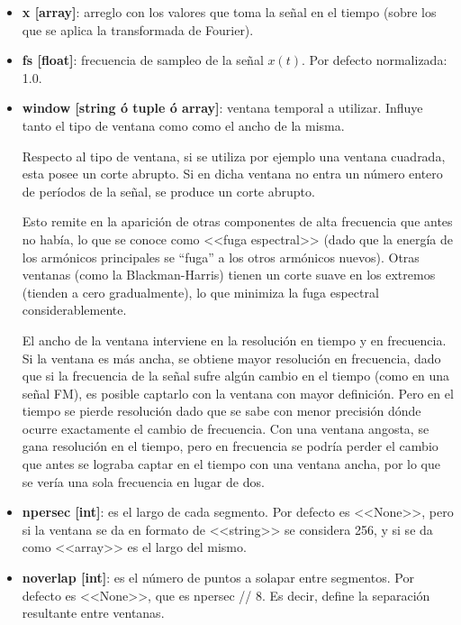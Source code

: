 \documentclass[assd_tp2_main.tex]{subfiles}
\begin{document}
\begin{itemize}

\item \textbf{x [array]}: arreglo con los valores que toma la se\~nal en el tiempo (sobre los que se aplica la transformada de Fourier).

\item \textbf{fs [float]}: frecuencia de sampleo de la se\~nal $x(t)$. Por defecto normalizada: 1.0.

\item \textbf{window [string \'o tuple \'o array]}: ventana temporal a utilizar. Influye tanto el tipo de ventana como como el ancho de la misma.\par
Respecto al tipo de ventana, si se utiliza por ejemplo una ventana cuadrada, esta posee un corte abrupto. Si en dicha ventana no entra un n\'umero entero de per\'iodos de la se\~nal, se produce un corte abrupto.\par
Esto remite en la aparici\'on de otras componentes de alta frecuencia que antes no hab\'ia, lo que se conoce como <<fuga espectral>> (dado que la energ\'ia de los arm\'onicos principales se ``fuga'' a los otros arm\'onicos nuevos). Otras ventanas (como la Blackman-Harris) tienen un corte suave en los extremos (tienden a cero gradualmente), lo que minimiza la fuga espectral considerablemente.\par
El ancho de la ventana interviene en la resoluci\'on en tiempo y en frecuencia. Si la ventana es m\'as ancha, se obtiene mayor resoluci\'on en frecuencia, dado que si la frecuencia de la se\~nal sufre alg\'un cambio en el tiempo (como en una se\~nal FM), es posible captarlo con la ventana con mayor definici\'on. Pero en el tiempo se pierde resoluci\'on dado que se sabe con menor precisi\'on d\'onde ocurre exactamente el cambio de frecuencia. Con una ventana angosta, se gana resoluci\'on en el tiempo, pero en frecuencia se podr\'ia perder el cambio que antes se lograba captar en el tiempo con una ventana ancha, por lo que se ver\'ia una sola frecuencia en lugar de dos.

\item \textbf{npersec [int]}: es el largo de cada segmento. Por defecto es <<None>>, pero si la ventana se da en formato de <<string>> se considera 256, y si se da como <<array>> es el largo del mismo.

\item \textbf{noverlap [int]}: es el n\'umero de puntos a solapar entre segmentos. Por defecto es <<None>>, que es npersec // 8. Es decir, define la separaci\'on resultante entre ventanas.


\end{itemize}
\end{document}
